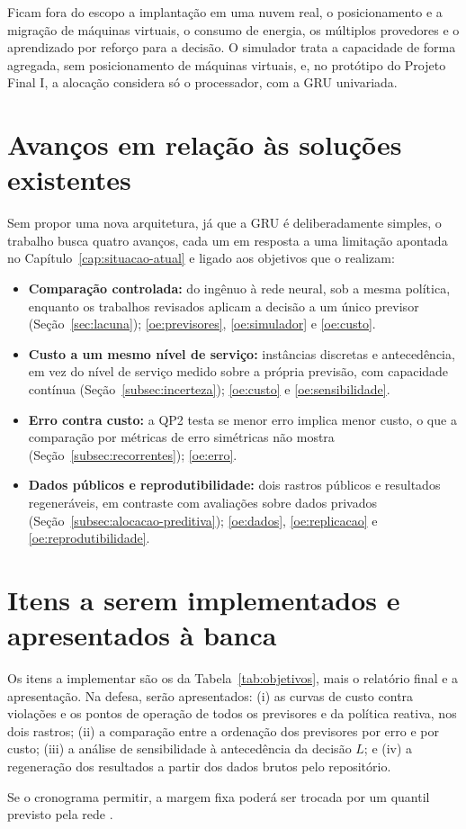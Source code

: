 Ficam fora do escopo a implantação em uma nuvem real, o posicionamento e a migração de máquinas virtuais, o consumo de energia, os múltiplos provedores e o aprendizado por reforço para a decisão. O simulador trata a capacidade de forma agregada, sem posicionamento de máquinas virtuais, e, no protótipo do Projeto Final I, a alocação considera só o processador, com a GRU univariada.

\section{Avanços em relação às soluções existentes}
\label{sec:avancos}

Sem propor uma nova arquitetura, já que a GRU é deliberadamente simples, o trabalho busca quatro avanços, cada um em resposta a uma limitação apontada no Capítulo~\ref{cap:situacao-atual} e ligado aos objetivos que o realizam:

\begin{itemize}
    \item \textbf{Comparação controlada:} do ingênuo à rede neural, sob a mesma política, enquanto os trabalhos revisados aplicam a decisão a um único previsor (Seção~\ref{sec:lacuna}); \ref{oe:previsores}, \ref{oe:simulador} e \ref{oe:custo}.
    \item \textbf{Custo a um mesmo nível de serviço:} instâncias discretas e antecedência, em vez do nível de serviço medido sobre a própria previsão, com capacidade contínua (Seção~\ref{subsec:incerteza}); \ref{oe:custo} e \ref{oe:sensibilidade}.
    \item \textbf{Erro contra custo:} a QP2 testa se menor erro implica menor custo, o que a comparação por métricas de erro simétricas não mostra (Seção~\ref{subsec:recorrentes}); \ref{oe:erro}.
    \item \textbf{Dados públicos e reprodutibilidade:} dois rastros públicos e resultados regeneráveis, em contraste com avaliações sobre dados privados (Seção~\ref{subsec:alocacao-preditiva}); \ref{oe:dados}, \ref{oe:replicacao} e \ref{oe:reprodutibilidade}.
\end{itemize}

\section{Itens a serem implementados e apresentados à banca}
\label{sec:entregaveis}

Os itens a implementar são os da Tabela~\ref{tab:objetivos}, mais o relatório final e a apresentação. Na defesa, serão apresentados: (i) as curvas de custo contra violações e os pontos de operação de todos os previsores e da política reativa, nos dois rastros; (ii) a comparação entre a ordenação dos previsores por erro e por custo; (iii) a análise de sensibilidade à antecedência da decisão $L$; e (iv) a regeneração dos resultados a partir dos dados brutos pelo repositório.

Se o cronograma permitir, a margem fixa poderá ser trocada por um quantil previsto pela rede \cite{rossi2023forecasting, pan2023magicscaler}.
